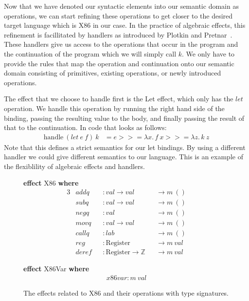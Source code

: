 \documentclass[a4paper,UKenglish,cleveref, autoref, thm-restate, anonymous]{oasics-v2021}
\newcommand\bind[1]{>\!\!>\!\!= \lambda #1.\,}
\begin{document}
Now that we have denoted our syntactic elements into our semantic domain as operations, we can start refining these operations to get closer to the desired target language which is X86 in our case.
In the practice of algebraic effects, this refinement is facillitated by handlers as introduced by Plotkin and Pretnar~\cite{10.1007/978-3-642-00590-9_7}.
These handlers give us access to the operations that occur in the program and the continuation of the program which we will simply call $k$.
We only have to provide the rules that map the operation and continuation onto our semantic domain consisting of primitives, existing operations, or newly introduced operations.

The effect that we choose to handle first is the Let effect, which only has the $\mathit{let}$ operation.
We handle this operation by running the right hand side of the binding, passing the resulting value to the body, and finally passing the result of that to the continuation. In code that looks as follows:
\begin{align*}
  \mathrm{handle}~(\mathit{let}~e~f)~k & = e \bind{x} f~x \bind{z} k~z
\end{align*}
Note that this defines a strict semantics for our let bindings.
By using a different handler we could give different semantics to our language.
This is an example of the flexiblility of algebraic effects and handlers.

\begin{figure}[ht]
  \begin{minipage}[t]{0.4\textwidth}
  \textbf{effect} X86 \textbf{where}
  \vspace{-1em}
  \begin{alignat*}{3}
    & \mathit{addq}  && : \mathit{val} \to \mathit{val} && \to m~() \\
    & \mathit{subq}  && : \mathit{val} \to \mathit{val} && \to m~() \\
    & \mathit{negq}  && : \mathit{val}                  && \to m~() \\
    & \mathit{movq}  && : \mathit{val} \to \mathit{val} && \to m~() \\
    & \mathit{callq} && : \mathit{lab}                  && \to m~() \\
    & \mathit{reg}   && : \mathrm{Register}             && \to m~\mathit{val} \\
    & \mathit{deref} && : \mathrm{Register} \to \mathit{\mathbb{Z}} && \to m~\mathit{val}
  \end{alignat*}
  \end{minipage}
  \begin{minipage}[t]{0.4\textwidth}
  \textbf{effect} X86Var \textbf{where}
  \vspace{-1em}
  \begin{align*}
    \mathit{x86var} : m~\mathit{val}
  \end{align*}
  \end{minipage}
  \caption{The effects related to X86 and their operations with type signatures.}\label{fig:x86-ops}
\end{figure}
\end{document}
